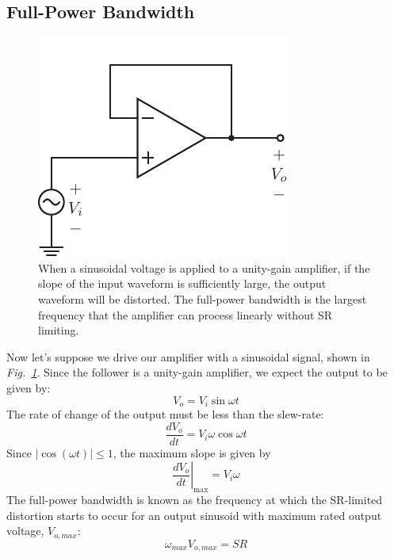 \subsection{Full-Power Bandwidth}
\begin{figure}[tb]
\centering
\includegraphics[scale=1]{opamp_unitygain}
\caption{When a sinusoidal voltage is applied to a unity-gain amplifier, if the slope of the input waveform is sufficiently large, the output waveform will be distorted.  The full-power bandwidth is the largest frequency that the amplifier can process linearly without SR limiting.}
\label{fig:opamp_unitygain_fig}
\end{figure}
Now let's suppose we drive our amplifier with a sinusoidal signal, shown in \emph{Fig.~\ref{fig:opamp_unitygain_fig}}.  Since the follower is a  unity-gain amplifier, we expect the output to be given by:
    \begin{equation} 
        V_o = V_i \sin\omega t 
    \end{equation}
The rate of change of the output must be less than the slew-rate:
    \begin{equation}
        \frac{dV_o}{dt} = V_i \omega \cos\omega t 
    \end{equation}
Since $|\cos(\omega t)| \le 1$, the maximum slope is given by
    \begin{equation}
        \left. \frac{dV_o}{dt} \right|_{\text{max}} = V_i \omega 
    \end{equation}
The full-power bandwidth is known as the frequency at which the SR-limited distortion starts to occur for an output sinusoid with maximum rated output voltage, $V_{o,max}$:
    \begin{equation}
        \omega_{max} V_{o,max} = SR
    \end{equation} 
